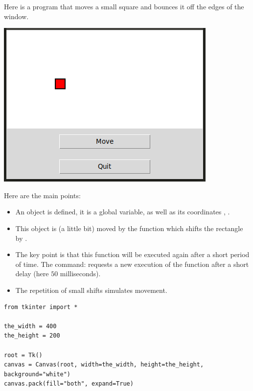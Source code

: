 \documentclass[11pt,class=report,crop=false]{standalone}
\begin{document}
\begin{cours}


Here is a program that moves a small square and bounces it off the edges of the window.

\begin{center}
\includegraphics[scale=\myscale,scale=0.5]{screen-blocks-lesson-move-en}
\end{center}

Here are the main points:
\begin{itemize}
  \item An object  is defined, it is a global variable, as well as its coordinates , .
  
  \item This object is (a little bit) moved by the function  which shifts the rectangle by .
    
  \item The key point is that this function will be executed again after a short period of time. The command: 
  requests a new execution of the function  after a short delay (here $50$ milliseconds).
  
  \item The repetition of small shifts simulates movement.
\end{itemize}

\begin{lstlisting}
from tkinter import *

the_width = 400
the_height = 200

root = Tk()     
canvas = Canvas(root, width=the_width, height=the_height, background="white")
canvas.pack(fill="both", expand=True)


\end{lstlisting}
\end{cours}
\end{document}
